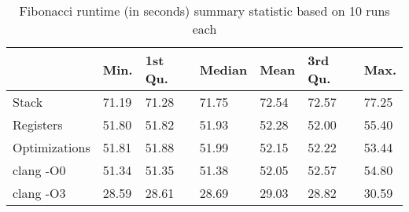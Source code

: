 \begin{table}[h!]
\centering
\begin{tabular}{p{}p{}p{}p{}p{}p{}p{}}
  \hline
 & Min. & 1st Qu. & Median & Mean & 3rd Qu. & Max. \\ 
  \hline
Stack & 71.19 & 71.28 & 71.75 & 72.54 & 72.57 & 77.25 \\ 
  Registers & 51.80 & 51.82 & 51.93 & 52.28 & 52.00 & 55.40 \\ 
  Optimizations & 51.81 & 51.88 & 51.99 & 52.15 & 52.22 & 53.44 \\ 
  clang -O0 & 51.34 & 51.35 & 51.38 & 52.05 & 52.57 & 54.80 \\ 
  clang -O3 & 28.59 & 28.61 & 28.69 & 29.03 & 28.82 & 30.59 \\ 
   \hline
\end{tabular}
\caption{Fibonacci runtime (in seconds) summary statistic based on 10 runs each}
\end{table}
